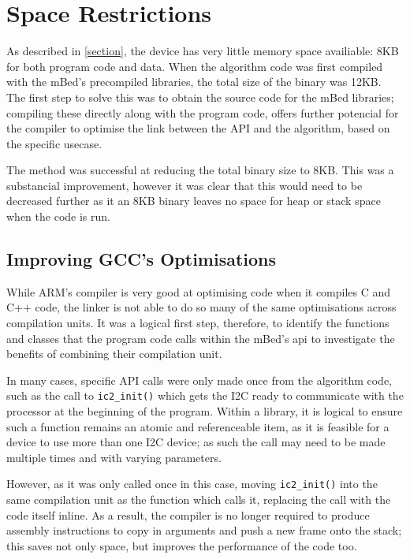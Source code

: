 \section{Space Restrictions}

As described in \ref{section}, the device has very little memory space availiable: 8KB for both program code and data. When the algorithm code was first compiled with the mBed's precompiled libraries, the total size of the binary was 12KB. The first step to solve this was to obtain the source code for the mBed libraries; compiling these directly along with the program code, offers further potencial for the compiler to optimise the link between the API and the algorithm, based on the specific usecase.

The method was successful at reducing the total binary size to 8KB. This was a substancial improvement, however it was clear that this would need to be decreased further as it an 8KB binary leaves no space for heap or stack space when the code is run.

\subsection{Improving GCC's Optimisations}

While ARM's compiler is very good at optimising code when it compiles C and C++ code, the linker is not able to do so many of the same optimisations across compilation units. It was a logical first step, therefore, to identify the functions and classes that the program code calls within the mBed's api to investigate the benefits of combining their compilation unit.

In many cases, specific API calls were only made once from the algorithm code, such as the call to \verb|ic2_init()| which gets the I2C ready to communicate with the processor at the beginning of the program. Within a library, it is logical to ensure such a function remains an atomic and referenceable item, as it is feasible for a device to use more than one I2C device; as such the call may need to be made multiple times and with varying parameters.

However, as it was only called once in this case, moving \verb|ic2_init()| into the same compilation unit as the function which calls it, replacing the call with the code itself inline. As a result, the compiler is no longer required to produce assembly instructions to copy in arguments and push a new frame onto the stack; this saves not only space, but improves the performance of the code too.

